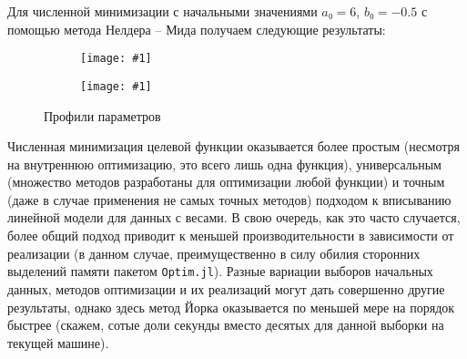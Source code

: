 \documentclass[a4paper, oneside]{article}
\newlength{\imagewidth}
\newlength{\imageheight}
\newcommand{\subgraphics}[1]{
\settowidth{\imagewidth}{\texttt{[image: \#1]}}%
\begin{subfigure}{\imagewidth}%
    \texttt{[image: \#1]}%
\end{subfigure}%
}
\begin{document}
Для численной минимизации с начальными значениями $ a₀ = 6 $, $ b₀ = -0.5 $ с помощью метода Нелдера -- Мида получаем следующие результаты:



\begin{figure}[h!]
  \setlength{\imageheight}{5.96cm}
  \centering
  \subgraphics{a}
  \subgraphics{b}
  \caption{Профили параметров}
\end{figure}

Численная минимизация целевой функции оказывается более простым (не\-смотря на внутреннюю оптимизацию, это всего лишь одна функция), универсальным (множество методов разработаны для оптимизации любой функции) и точным (даже в случае применения не самых точных методов) подходом к вписыванию линейной модели для данных с весами. В свою очередь, как это часто случается, более общий подход приводит к меньшей производительности в зависимости от реализации (в данном случае, преимущественно в силу обилия сторонних выделений памяти пакетом \texttt{Optim.jl}). Разные вариации выборов начальных данных, методов оптимизации и их реализаций могут дать совершенно другие результаты, однако здесь метод Йорка оказывается по меньшей мере на порядок быстрее (скажем, сотые доли секунды вместо десятых для данной выборки на текущей машине).
\end{document}
